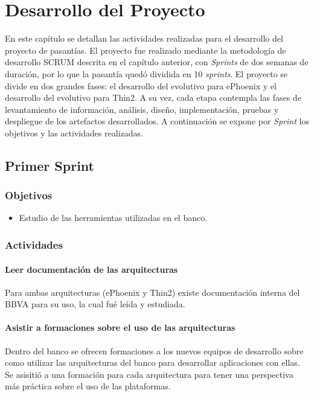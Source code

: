 \chapter{Desarrollo del Proyecto}
\label{capitulo4}

En este capítulo se detallan las actividades realizadas para el
desarrollo del proyecto de pasantías. El proyecto fue realizado
mediante la metodología de desarrollo SCRUM descrita en el capítulo
anterior, con \emph{Sprints} de dos semanas de duración, por lo
que la pasantía quedó dividida en 10 \emph{sprints}. El proyecto
se divide en dos grandes fases: el desarrollo del evolutivo para ePhoenix
y el desarrollo del evolutivo para Thin2. A su vez, cada etapa contempla
las fases de levantamiento de información, análisis, diseño, implementación,
pruebas y despliegue de los artefactos desarrollados. A continuación se
expone por \emph{Sprint} los objetivos y las actividades realizadas.

\section{Primer Sprint}

\subsection{Objetivos}
\begin{itemize}
\item Estudio de las herramientas utilizadas en el banco.
\end{itemize}
\subsection{Actividades}
\subsubsection{Leer documentación de las arquitecturas}
Para ambas arquitecturas (ePhoenix y Thin2) existe documentación interna del BBVA
para su uso, la cual fué leída y estudiada.
\subsubsection{Asistir a formaciones sobre el uso de las arquitecturas}
Dentro del banco se ofrecen formaciones a los nuevos equipos de desarrollo
sobre como utilizar las arquitecturas del banco para desarrollar aplicaciones con
ellas. Se asisitió a una formación para cada arquitectura para tener
una perspectiva más práctica sobre el uso de las plataformas.
